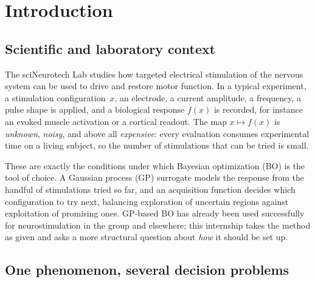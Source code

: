 \section{Introduction}
\label{sec:intro}

\subsection{Scientific and laboratory context}
\label{sec:intro-context}

The sciNeurotech Lab studies how targeted electrical stimulation of the nervous
system can be used to drive and restore motor function. In a typical experiment,
a stimulation configuration~$x$, an electrode, a current amplitude, a
frequency, a pulse shape is applied, and a biological response $f(x)$ is
recorded, for instance an evoked muscle activation or a cortical readout. The
map $x\mapsto f(x)$ is \emph{unknown}, \emph{noisy}, and above all
\emph{expensive}: every evaluation consumes experimental time on a living
subject, so the number of stimulations that can be tried is small.

These are exactly the conditions under which Bayesian optimization (BO) is the
tool of choice. A Gaussian process (GP) surrogate models the response from the
handful of stimulations tried so far, and an acquisition function decides which
configuration to try next, balancing exploration of uncertain regions against
exploitation of promising ones. GP-based BO has already been used successfully
for neurostimulation in the group and elsewhere; this internship takes the
method as given and asks a more structural question about \emph{how} it should be
set up.

\subsection{One phenomenon, several decision problems}
\label{sec:intro-onephenomenon}

